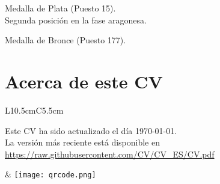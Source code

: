 \documentclass[combined.tex]{subfiles}
\begin{document}
Medalla de Plata (Puesto 15).\\
Segunda posición en la fase aragonesa.

Medalla de Bronce (Puesto 177).

\newpage

\section{Acerca de este CV}
\begin{tabular}{L{10.5cm}C{5.5cm}}
\begin{minipage}[b]{10cm}
Este CV ha sido actualizado el día \today.\\
La versión más reciente está disponible en \\ \url{https://raw.githubusercontent.com/CV/CV_ES/CV.pdf}
\end{minipage} & \texttt{[image: qrcode.png]}
\end{tabular}
\end{document}
